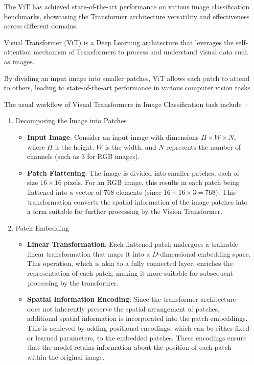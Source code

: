 \documentclass[12pt,a4paper]{report}
\begin{document}
The ViT has achieved state-of-the-art performance on various image classification benchmarks, showcasing the Transformer architecture versatility and effectiveness across different domains.

Visual Transformer (ViT) is a Deep Learning architecture that leverages the self-attention mechanism of Transformers to process and understand visual data such as images.

By dividing an input image into smaller patches, ViT allows each patch to attend to others, leading to state-of-the-art performance in various computer vision tasks

The usual workflow of Visual Transformers in Image Classification task include~\cite{vit}:

\begin{enumerate}
  \item Decomposing the Image into Patches
        \begin{itemize}
          \item \textbf{Input Image}: Consider an input image with dimensions \( H \times W \times N \), where \( H \) is the height, \( W \) is the width, and \( N \) represents the number of channels (such as 3 for RGB images).
          \item \textbf{Patch Flattening}: The image is divided into smaller patches, each of size \( 16 \times 16 \) pixels. For an RGB image, this results in each patch being flattened into a vector of 768 elements (since \( 16 \times 16 \times 3 = 768 \)). This transformation converts the spatial information of the image patches into a form suitable for further processing by the Vision Transformer.
        \end{itemize}

  \item Patch Embedding
        \begin{itemize}
          \item \textbf{Linear Transformation}: Each flattened patch undergoes a trainable linear transformation that maps it into a \( D \)-dimensional embedding space. This operation, which is akin to a fully connected layer, enriches the representation of each patch, making it more suitable for subsequent processing by the transformer.
          \item \textbf{Spatial Information Encoding}: Since the transformer architecture does not inherently preserve the spatial arrangement of patches, additional spatial information is incorporated into the patch embeddings. This is achieved by adding positional encodings, which can be either fixed or learned parameters, to the embedded patches. These encodings ensure that the model retains information about the position of each patch within the original image.
        \end{itemize}


\end{enumerate}
\end{document}
